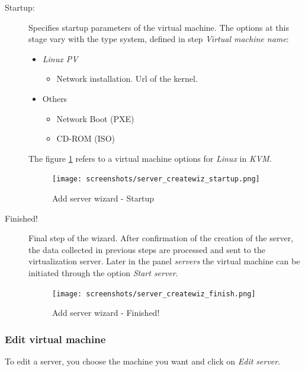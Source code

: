 \begin{description}
        \item[Startup:] Specifies startup parameters of the virtual machine. The options at this stage vary with the type system, defined in step \emph{Virtual machine name}:		\label{sec:add_server_boot}
        \begin{itemize}
			\item \emph{Linux PV}
				\begin{itemize}
					\item Network installation. Url of the kernel.
				\end{itemize}
			\item Others
				\begin{itemize}
					\item Network Boot (PXE)
					\item CD-ROM (ISO)
				\end{itemize}
		\end{itemize}
        The figure \ref{fig:server_createwiz_startup} refers to a virtual machine options for \emph{Linux} in \emph{KVM}.

		\begin{figure}[H]
			\begin{center}
			\texttt{[image: screenshots/server\_createwiz\_startup.png]}
			\caption{Add server wizard - Startup}
			\label{fig:server_createwiz_startup}
			\end{center}
		\end{figure}

	\item[Finished!] Final step of the wizard. After confirmation of the creation of the server, the data collected in previous steps are processed and sent to the virtualization server. Later in the panel \emph{servers} the virtual machine can be initiated through the option \emph{Start server}.

		\begin{figure}[H]
			\begin{center}
			\texttt{[image: screenshots/server\_createwiz\_finish.png]}
			\caption{Add server wizard - Finished!}
			\label{fig:server_createwiz_finish}
			\end{center}
		\end{figure}

\end{description}

\subsubsection{Edit virtual machine}
\label{sec:edit_server}
To edit a server, you choose the machine you want and click on \emph{Edit server}.

